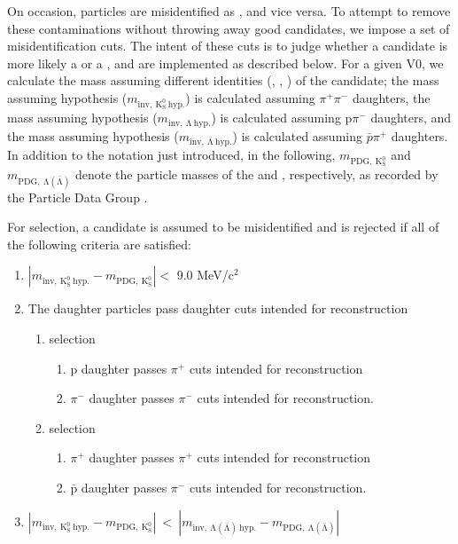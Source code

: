 \documentclass[/home/jesse/Analysis/FemtoAnalysis/AnalysisNotes/AnalysisNoteJBuxton.tex]{subfiles}
\begin{document}
On occasion, \LamALam particles are misidentified as \Ks, and vice versa.  
To attempt to remove these contaminations without throwing away good candidates, we impose a set of misidentification cuts.  
The intent of these cuts is to judge whether a candidate is more likely a \LamALam or a \Ks, and are implemented as described below.  
For a given V0, we calculate the mass assuming different identities (\Lam, \ALam, \Ks) of the candidate; the mass assuming \Ks hypothesis ($m_{\mathrm{inv,~ K^{0}_{S}~ hyp.}}$) is calculated assuming $\pi^{+}\pi^{-}$ daughters, the mass assuming \Lam hypothesis ($m_{\mathrm{inv,~ \Lambda~ hyp.}}$) is calculated assuming p$\pi^{-}$ daughters, and the mass assuming \ALam hypothesis ($m_{\mathrm{inv,~ \bar{\Lambda}~ hyp.}}$) is calculated assuming $\bar{p}\pi^{+}$ daughters.  
In addition to the notation just introduced, in the following, $m_{\mathrm{PDG,~ K^{0}_{S}}}$ and $m_{\mathrm{PDG,~ \Lambda(\bar{\Lambda})}}$ denote the particle masses of the \Ks and \LamALam, respectively, as recorded by the Particle Data Group \cite{Patrignani:2016xqp}.

For \LamALam selection, a candidate is assumed to be misidentified and is rejected if all of the following criteria are satisfied:

\begin{enumerate}
 \item $\left|m_{\mathrm{inv,~ K^{0}_{S}~ hyp.}} - m_{\mathrm{PDG,~ K^{0}_{S}}}\right| < $ 9.0 MeV/c$^{2}$
 \item The daughter particles pass daughter cuts intended for \Ks reconstruction
 \begin{enumerate}
  \item \Lam selection
  \begin{enumerate}
   \item p daughter passes $\pi^{+}$ cuts intended for \Ks reconstruction
   \item $\pi^{-}$ daughter passes $\pi^{-}$ cuts intended for \Ks reconstruction.
  \end{enumerate}
  \item \ALam selection
  \begin{enumerate}
   \item $\pi^{+}$ daughter passes $\pi^{+}$ cuts intended for \Ks reconstruction
   \item $\bar{\mathrm{p}}$ daughter passes $\pi^{-}$ cuts intended for \Ks reconstruction.
  \end{enumerate}  
 \end{enumerate}
 \item $\left|m_{\mathrm{inv,~ K^{0}_{S}~ hyp.}} - m_{\mathrm{PDG,~ K^{0}_{S}}}\right|~ < ~\left|m_{\mathrm{inv,~ \Lambda(\bar{\Lambda})~ hyp.}} - m_{\mathrm{PDG,~ \Lambda(\bar{\Lambda})}}\right|$
\end{enumerate} 
\end{document}
